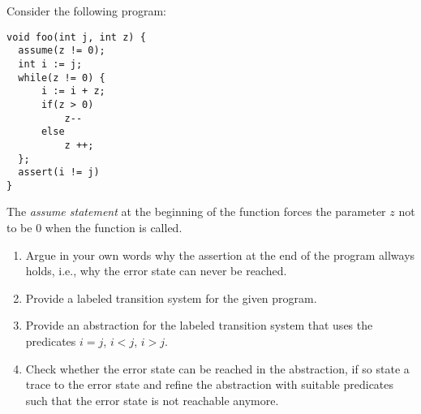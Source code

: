Consider the following program:
\begin{verbatim}
void foo(int j, int z) {
  assume(z != 0);
  int i := j;
  while(z != 0) {
      i := i + z;
      if(z > 0)
          z--
      else
          z ++;
  };
  assert(i != j)
}
\end{verbatim}

The {\em assume statement} at the beginning of the function forces the parameter $z$ not to be 0 when the function is called.

\begin{enumerate}

 \item Argue in your own words why the assertion at the end of the program allways holds, i.e., why the error state can never be reached.

 \item Provide a labeled transition system for the given program.

 \item Provide an abstraction for the labeled transition system that uses the predicates $i = j$, $i < j$, $i > j$.

 \item Check whether the error state can be reached in the abstraction, if so state a trace to the error state and refine the abstraction with suitable predicates such that the error state is not reachable anymore.

\end{enumerate}
